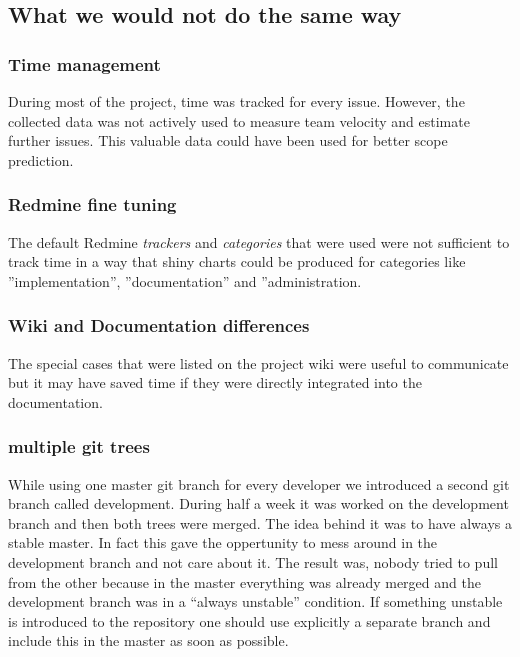 \subsection{What we would not do the same way}

\subsubsection{Time management}
During most of the project, time was tracked for every issue. 
However, the collected data was not actively used to measure team velocity and 
estimate further issues. This valuable data could have been used for better 
scope prediction.

\subsubsection{Redmine fine tuning}
The default Redmine \textit{trackers} and \textit{categories} that were used 
were not sufficient to track time in a way that shiny charts could be produced 
for categories like ''implementation'', ''documentation'' and ''administration. 

\subsubsection{Wiki and Documentation differences}
The special cases that were listed on the project wiki were useful to 
communicate but it may have saved time if they were directly integrated into 
the documentation.

\subsubsection{multiple git trees}
While using one master git branch for every developer we introduced a second
git branch called development. During half a week it was worked on the
development branch and then both trees were merged. The idea behind it was to
have always a stable master. In fact this gave the oppertunity to mess around
in the development branch and not care about it. The result was, nobody tried
to pull from the other because in the master everything was already merged and
the development branch was in a ``always unstable'' condition.
If something unstable is introduced to the repository one should use explicitly
a separate branch and include this in the master as soon as possible.